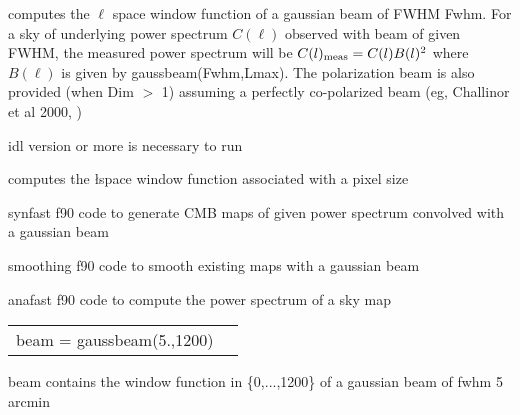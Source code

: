 
\begin{codedescription}
{\facname{} computes the $\ell$ space window function of a gaussian beam of FWHM
Fwhm. For a sky of underlying power spectrum $C(\ell)$ observed with beam of
given FWHM, the measured power spectrum will be $C(\ell)_{\rm meas} = C(\ell)
B(\ell)^2$ where $B(\ell)$ is given by gaussbeam(Fwhm,Lmax). The
polarization beam is also provided (when Dim $>$ 1) assuming a perfectly
co-polarized beam (eg, Challinor et al 2000, 
)}
\end{codedescription}



\begin{related}
  \begin{sulist}{} %
    \item[idl] version \idlversion or more is necessary to run \facname
    \item[\htmlref{healpixwindow}{idl:healpixwindow}] computes the \l space window function associated with
    a \healpix pixel size
    \item[synfast] f90 code to generate CMB maps of given power spectrum convolved with a gaussian beam
    \item[smoothing] f90 code to smooth existing \healpix maps with a gaussian beam
    \item[anafast] f90 code to compute the power spectrum of a \healpix sky map
  \end{sulist}
\end{related}

\begin{example}
{
\begin{tabular}{ll} %
beam = gaussbeam(5.,1200)
\end{tabular}
}
{
beam contains the window function in \{0,...,1200\} of a gaussian beam of fwhm 5 arcmin}
\end{example}


